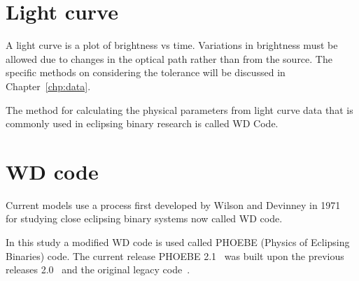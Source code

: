\section{Light curve}
A light curve is a plot of brightness vs time. 
Variations in brightness must be allowed due to changes in the optical path rather than
from the source.
The specific methods on considering the tolerance will be discussed in Chapter~\ref{chp:data}.

The method for calculating the physical parameters from light curve data that is commonly used in
eclipsing binary research is called WD Code.

\section{WD code}
Current models use a process first developed by Wilson and Devinney in 1971~\cite{wilson_devinney_1971}
for studying close eclipsing binary systems now called WD code.

In this study a modified WD code is used called PHOEBE (Physics of Eclipsing Binaries) code.
The current release PHOEBE 2.1~\cite{horvat_2018} was built upon the previous releases 2.0~\cite{prsa_2016}
and the original legacy code~\cite{prsa_2005}. 




